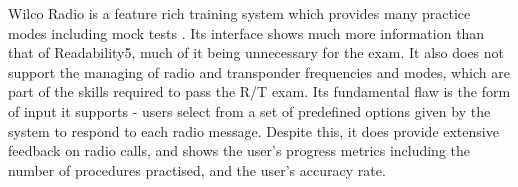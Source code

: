 Wilco Radio is a feature rich training system which provides many practice modes including mock tests \cite{Wilco-Radio}. Its interface shows much more information than that of Readability5, much of it being unnecessary for the exam. It also does not support the managing of radio and transponder frequencies and modes, which are part of the skills required to pass the R/T exam. Its fundamental flaw is the form of input it supports - users select from a set of predefined options given by the system to respond to each radio message. Despite this, it does provide extensive feedback on radio calls, and shows the user's progress metrics including the number of procedures practised, and the user's accuracy rate.
